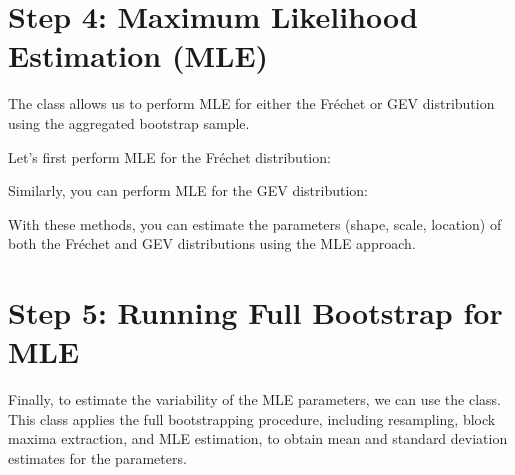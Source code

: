 \documentclass[a4paper,11pt,openany,english]{sphinxmanual}
\begin{document}
\section{Step 4: Maximum Likelihood Estimation (MLE)}
\label{\detokenize{bootstrap:step-4-maximum-likelihood-estimation-mle}}
\sphinxAtStartPar
The  class allows us to perform MLE for either the Fréchet or GEV distribution using the aggregated bootstrap sample.

\sphinxAtStartPar
Let’s first perform MLE for the Fréchet distribution:

\begin{sphinxVerbatim}[commandchars=\\\{\}]
   

  

  
 
\end{sphinxVerbatim}

\sphinxAtStartPar
Similarly, you can perform MLE for the GEV distribution:

\begin{sphinxVerbatim}[commandchars=\\\{\}]
  
 
\end{sphinxVerbatim}

\sphinxAtStartPar
With these methods, you can estimate the parameters (shape, scale, location) of both the Fréchet and GEV distributions using the MLE approach.


\section{Step 5: Running Full Bootstrap for MLE}
\label{\detokenize{bootstrap:step-5-running-full-bootstrap-for-mle}}
\sphinxAtStartPar
Finally, to estimate the variability of the MLE parameters, we can use the  class. This class applies the full bootstrapping procedure, including resampling, block maxima extraction, and MLE estimation, to obtain mean and standard deviation estimates for the parameters.
\end{document}
